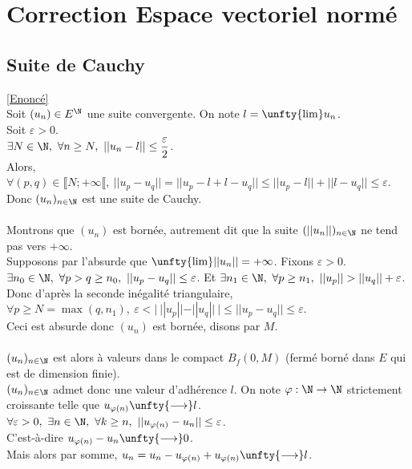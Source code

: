 \documentclass{book}
\begin{document}
\section{Correction Espace vectoriel normé}
	\subsection{Suite de Cauchy }\label{sec:suite-de-cauchy-etoile-2}
		\textcolor{blue}{\hyperref[Suite de Cauchy]{[Enoncé]}}\\
	Soit $(u_n)\in E^\N$ une suite convergente. On note $l=\unfty{\lim}u_n$.\\
	Soit $\varepsilon>0$.\\
	$\exists N\in \N,\ \forall n\geq N,\ ||u_n-l||\leq \displaystyle\frac{\varepsilon}{2}$.\\
	Alors, $\forall (p,q)\in \llbracket N;+\infty\llbracket,\ ||u_p-u_q||=||u_p-l+l-u_q||\leq ||u_p-l||+||l-u_q||\leq \varepsilon$.\\
	Donc $(u_n)_{n\in \N}$ est une suite de Cauchy.\\\\
	Montrons que $(u_n)$ est bornée, autrement dit que la suite $(||u_n||)_{n\in \N}$ ne tend pas vers $+\infty$.\\
	Supposons par l'absurde que $\unfty{\lim}||u_n||=+\infty$. Fixons $\varepsilon>0$.\\
	$\exists n_0\in \N,\ \forall p>q\geq n_0,\ ||u_p-u_q||\leq \varepsilon$. Et $\exists n_1\in \N,\ \forall p\geq n_1,\ ||u_p||>||u_q||+\varepsilon$.\\
	Donc d'après la seconde inégalité triangulaire, $\forall p\geq N=\max(q,n_1),\ \varepsilon<|\ ||u_p||-||u_q||\ |\leq ||u_p-u_q||\leq \varepsilon$.\\
	Ceci est absurde donc $(u_n)$ est bornée, disons par $M$.\\\\
	$(u_n)_{n\in \N}$ est alors à valeurs dans le compact $B_f(0,M)$ (fermé borné dans $E$ qui est de dimension finie).\\
	$(u_n)_{n\in \N}$ admet donc une valeur d'adhérence $l$. On note $\varphi:\N\to\N$ strictement croissante telle que $u_{\varphi(n)}\unfty{\longrightarrow}l$.\\
	$\forall \varepsilon>0,\ \exists n\in \N,\ \forall k\geq n,\ ||u_{\varphi(n)}-u_n||\leq \varepsilon$.\\
	C'est-à-dire $u_{\varphi(n)}-u_n\unfty{\longrightarrow}0$.\\
	Mais alors par somme, $u_n=u_n-u_{\varphi(n)}+u_{\varphi(n)}\unfty{\longrightarrow}l$.
\end{document}
